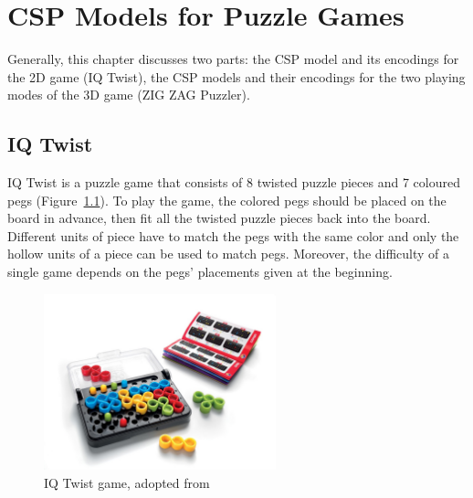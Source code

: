 \chapter{CSP Models for Puzzle Games}
\label{cha:design}
Generally, this chapter discusses two parts: the CSP model and its encodings for the 2D game (IQ Twist), the CSP models and their encodings for the two playing modes of the 3D game (ZIG ZAG Puzzler).
\section{IQ Twist}
IQ Twist is a puzzle game that consists of 8 twisted puzzle pieces and 7 coloured pegs (Figure~\ref{fig:IQ_twist_game}). To play the game, the colored pegs should be placed on the board in advance, then fit all the twisted puzzle pieces back into the board. Different units of piece have to match the pegs with the same color and only the hollow units of a piece can be used to match pegs. Moreover, the difficulty of a single game depends on the pegs' placements given at the beginning.
\begin{figure}[htbp]
    \centering
    \includegraphics[width=0.6\textwidth]{figs/IQtwistintroduction.jpg}
    \caption{IQ Twist game, adopted from~\cite{r21}}
    \label{fig:IQ_twist_game}
\end{figure}
